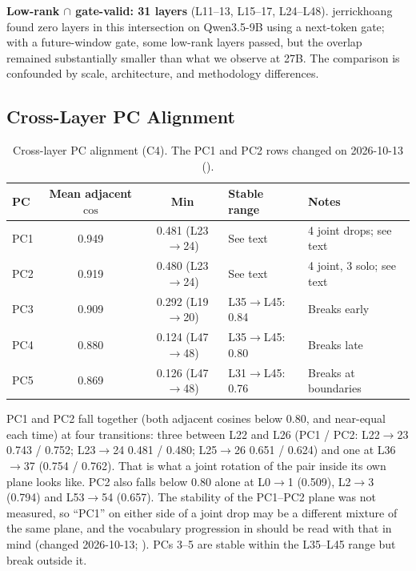 \documentclass[11pt,a4paper]{article}
\begin{document}
\textbf{Low-rank $\cap$ gate-valid: 31 layers} (L11--13, L15--17, L24--L48). jerrickhoang~\cite{jerrickhoang2026} found zero layers in this intersection on Qwen3.5-9B using a next-token gate; with a future-window gate, some low-rank layers passed, but the overlap remained substantially smaller than what we observe at 27B. The comparison is confounded by scale, architecture, and methodology differences.

\subsection{Cross-Layer PC Alignment}

\begin{table}[H]
\centering
\caption{Cross-layer PC alignment (C4). The PC1 and PC2 rows changed on 2026-10-13 ().}
\label{tab:alignment}
\begin{tabular}{lccll}
\toprule
PC & Mean adjacent $\cos$ & Min & Stable range & Notes \\
\midrule
PC1 & 0.949 & 0.481 (L23$\to$24) & See text & 4 joint drops; see text \\
PC2 & 0.919 & 0.480 (L23$\to$24) & See text & 4 joint, 3 solo; see text \\
PC3 & 0.909 & 0.292 (L19$\to$20) & L35$\to$L45: 0.84 & Breaks early \\
PC4 & 0.880 & 0.124 (L47$\to$48) & L35$\to$L45: 0.80 & Breaks late \\
PC5 & 0.869 & 0.126 (L47$\to$48) & L31$\to$L45: 0.76 & Breaks at boundaries \\
\bottomrule
\end{tabular}
\end{table}

PC1 and PC2 fall together (both adjacent cosines below 0.80, and near-equal each time) at four transitions: three between L22 and L26 (PC1 / PC2: L22$\to$23 0.743 / 0.752; L23$\to$24 0.481 / 0.480; L25$\to$26 0.651 / 0.624) and one at L36$\to$37 (0.754 / 0.762). That is what a joint rotation of the pair inside its own plane looks like. PC2 also falls below 0.80 alone at L0$\to$1 (0.509), L2$\to$3 (0.794) and L53$\to$54 (0.657). The stability of the PC1--PC2 plane was not measured, so ``PC1'' on either side of a joint drop may be a different mixture of the same plane, and the vocabulary progression in  should be read with that in mind (changed 2026-10-13; ). PCs 3--5 are stable within the L35--L45 range but break outside it.
\end{document}
